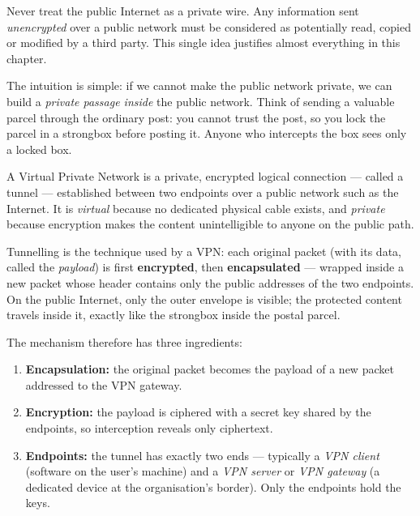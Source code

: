 \documentclass[11pt]{article}
\newcommand{\cle}[1]{{\popxbold\color{popdark}#1}}
\newcounter{popsec}
\newcounter{popsub}
\newcommand{\courssub}[1]{%
  \stepcounter{popsub}%
  \par\vspace{9pt}\noindent{\popxbold\fontsize{11.5}{13}\selectfont\color{popink}{\color{poporange}\thepopsec.\thepopsub}\hspace{6pt}#1}\par\nopagebreak\vspace{4pt}
}
\begin{document}
\begin{attention}
Never treat the public Internet as a private wire. Any information sent \emph{unencrypted} over a public network must be considered as potentially read, copied or modified by a third party. This single idea justifies almost everything in this chapter.
\end{attention}

\courssub{Definition of a VPN and of Tunnelling}

The intuition is simple: if we cannot make the public network private, we can build a \emph{private passage inside} the public network. Think of sending a valuable parcel through the ordinary post: you cannot trust the post, so you lock the parcel in a strongbox before posting it. Anyone who intercepts the box sees only a locked box.

\begin{definition}
A \cle{Virtual Private Network} is a private, encrypted logical connection — called a \cle{tunnel} — established between two \cle{endpoints} over a public network such as the Internet. It is \emph{virtual} because no dedicated physical cable exists, and \emph{private} because encryption makes the content unintelligible to anyone on the public path.
\end{definition}

\begin{definition}[Tunnelling]
\cle{Tunnelling} is the technique used by a VPN: each original packet (with its data, called the \emph{payload}) is first \textbf{encrypted}, then \textbf{encapsulated} — wrapped inside a new packet whose header contains only the public addresses of the two endpoints. On the public Internet, only the outer envelope is visible; the protected content travels inside it, exactly like the strongbox inside the postal parcel.
\end{definition}

The mechanism therefore has three ingredients:

\begin{enumerate}
\item \textbf{Encapsulation:} the original packet becomes the payload of a new packet addressed to the VPN gateway.
\item \textbf{Encryption:} the payload is ciphered with a secret key shared by the endpoints, so interception reveals only ciphertext.
\item \textbf{Endpoints:} the tunnel has exactly two ends — typically a \emph{VPN client} (software on the user's machine) and a \emph{VPN server} or \emph{VPN gateway} (a dedicated device at the organisation's border). Only the endpoints hold the keys.
\end{enumerate}
\end{document}
